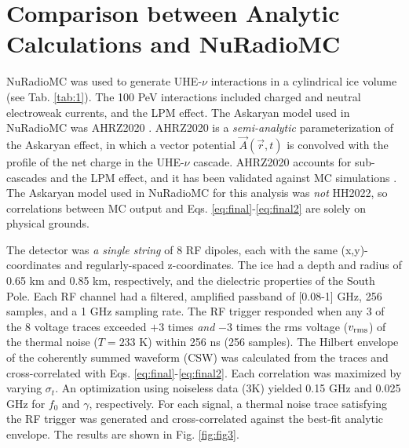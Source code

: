 \documentclass[amsmath,amssymb,aps,prd,10pt,twocolumn,showkeys]{revtex4}
\begin{document}
\section{Comparison between Analytic Calculations and NuRadioMC}
\label{sec:sim}

NuRadioMC was used to generate UHE-$\nu$ interactions in a cylindrical ice volume (see Tab. \ref{tab:1}).  The 100 PeV interactions included charged and neutral electroweak currents, and the LPM effect.  The Askaryan model used in NuRadioMC was AHRZ2020 \cite{PhysRevD.101.083005}.  AHRZ2020 is a \textit{semi-analytic} parameterization of the Askaryan effect, in which a vector potential $\vec{A}(\vec{r},t)$ is convolved with the profile of the net charge in the UHE-$\nu$ cascade.  AHRZ2020 accounts for sub-cascades and the LPM effect, and it has been validated against MC simulations \cite{zhs,10.1103/physrevd.84.103003}.  The Askaryan model used in NuRadioMC for this analysis was \textit{not} HH2022, so correlations between MC output and Eqs. \ref{eq:final}-\ref{eq:final2} are solely on physical grounds.

The detector was \textit{a single string} of 8 RF dipoles, each with the same (x,y)-coordinates and regularly-spaced z-coordinates.  The ice had a depth and radius of 0.65 km and 0.85 km, respectively, and the dielectric properties of the South Pole.  Each RF channel had a filtered, amplified passband of [0.08-1] GHz, 256 samples, and a 1 GHz sampling rate.  The RF trigger responded when any 3 of the 8 voltage traces exceeded $+3$ times \textit{and} $-3$ times the rms voltage ($v_{\rm rms}$) of the thermal noise ($T=233$ K) within 256 ns (256 samples).  The Hilbert envelope of the coherently summed waveform (CSW) was calculated from the traces and cross-correlated with Eqs. \ref{eq:final}-\ref{eq:final2}.  Each correlation was maximized by varying $\sigma_t$.  An optimization using noiseless data (3K) yielded 0.15 GHz and 0.025 GHz for $f_0$ and $\gamma$, respectively.  For each signal, a thermal noise trace satisfying the RF trigger was generated and cross-correlated against the best-fit analytic envelope.  The results are shown in Fig. \ref{fig:fig3}.
\end{document}
